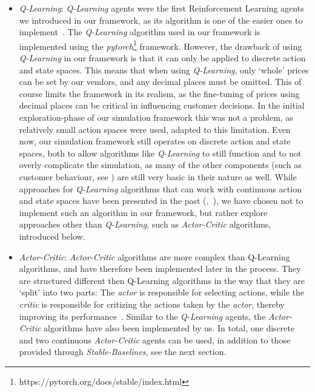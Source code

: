 \begin{itemize}
	\item {}\emph{Q-Learning}:\label{item:QLearning} \emph{Q-Learning} agents were the first Reinforcement Learning agents we introduced in our framework, as its algorithm is one of the easier ones to implement~\cite{reinforcementLearningOverview}. The \emph{Q-Learning} algorithm used in our framework is implemented using the \emph{pytorch}\footnote[0][-0.2]{https://pytorch.org/docs/stable/index.html} framework. However, the drawback of using \emph{Q-Learning} in our framework is that it can only be applied to discrete action and state spaces. This means that when using \emph{Q-Learning}, only `whole' prices can be set by our vendors, and any decimal places must be omitted. This of course limits the framework in its realism, as the fine-tuning of prices using decimal places can be critical in influencing customer decisions. In the initial exploration-phase of our simulation framework this was not a problem, as relatively small action spaces were used, adapted to this limitation. Even now, our simulation framework still operates on discrete action and state spaces, both to allow algorithms like \emph{Q-Learning} to still function and to not overly complicate the simulation, as many of the other components (such as customer behaviour, see ) are still very basic in their nature as well. While approaches for \emph{Q-Learning} algorithms that can work with continuous action and state spaces have been presented in the past (\cite{QLearningContinuous},~\cite{QLearningContinuous2}), we have chosen not to implement such an algorithm in our framework, but rather explore approaches other than \emph{Q-Learning}, such as \emph{Actor-Critic} algorithms, introduced below.

	\item {}\emph{Actor-Critic}:\label{item:ActorCritic} \emph{Actor-Critic} algorithms are more complex than Q-Learning algorithms, and have therefore been implemented later in the process. They are structured different then Q-Learning algorithms in the way that they are `split' into two parts: The \emph{actor} is responsible for selecting actions, while the \emph{critic} is responsible for critizing the actions taken by the \emph{actor}, thereby improving its performance~\cite{ActorCritic}. Similar to the \emph{Q-Learning} agents, the \emph{Actor-Critic} algorithms have also been implemented by us. In total, one discrete and two continuous \emph{Actor-Critic} agents can be used, in addition to those provided through \emph{Stable-Baselines}, see the next section.


\end{itemize}
